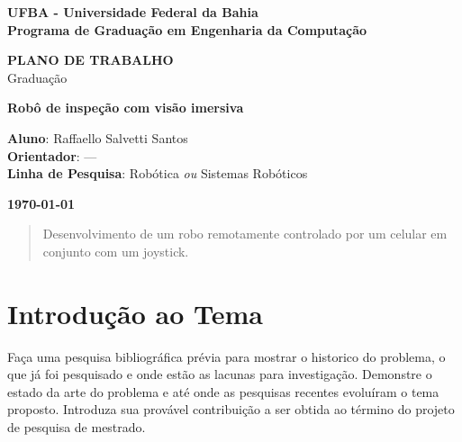 \documentclass[a4paper,12pt]{article}
\begin{document}

\begin{titlepage}
\thispagestyle{empty}
\begin{center}
\large{\bf{UFBA - Universidade Federal da Bahia}} \\
\large{\bf{Programa de Graduação em Engenharia da Computação}} \\
\end{center}
\vfill

\centering
\textbf{{\LARGE PLANO DE TRABALHO}}  \\ \vspace{0.5cm}
{\LARGE Graduação}
\vfill




\textbf{{\Large Robô de inspeção com visão imersiva}} \\ %
\vfill
\begin{flushleft}
\textbf{Aluno}: Raffaello Salvetti Santos \hfill{}\\
\textbf{Orientador}: --- \hfill{}\\
\textbf{Linha de Pesquisa}: Robótica {\it ou} Sistemas Robóticos \hfill{}\\
\end{flushleft}

\vfill


\begin{center}
\large{\bf{\today}}
\end{center}
\end{titlepage}



\begin{abstract}
Desenvolvimento de um robo remotamente controlado por um celular em conjunto com um joystick.
\end{abstract}


\section{Introdução ao Tema}
Faça uma pesquisa bibliográfica prévia para mostrar o historico do problema, o que já foi pesquisado e onde estão as lacunas para investigação. Demonstre o estado da arte do problema e até onde as pesquisas recentes evoluíram o tema proposto. Introduza sua provável contribuição a ser obtida ao término do projeto de pesquisa de mestrado.
\end{document}
